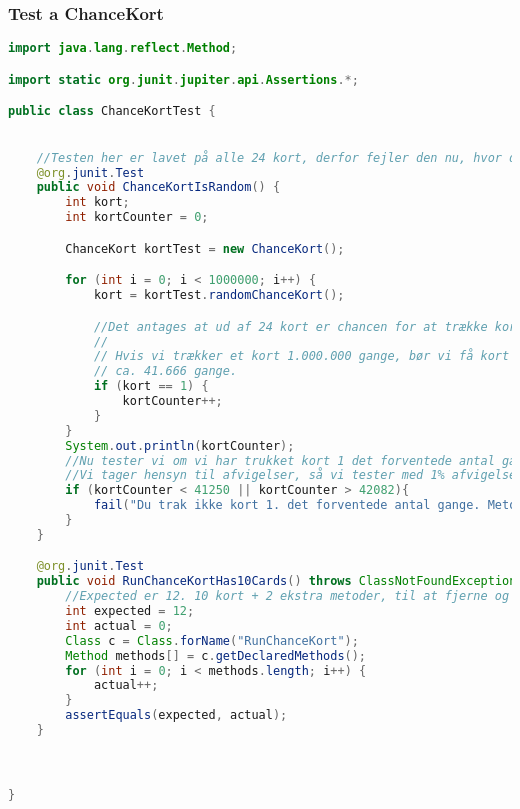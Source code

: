 \subsubsection{Test a ChanceKort}\label{ChanceKortTest}
\begin{lstlisting}[language=Java, caption=ChanceKort is random test]
import java.lang.reflect.Method;

import static org.junit.jupiter.api.Assertions.*;

public class ChanceKortTest {

    
    //Testen her er lavet på alle 24 kort, derfor fejler den nu, hvor der kun er 10 kort. Testen var en succes, da der var 24 kort. Dette ses også i rapporten.
    @org.junit.Test
    public void ChanceKortIsRandom() {
        int kort;
        int kortCounter = 0;

        ChanceKort kortTest = new ChanceKort();

        for (int i = 0; i < 1000000; i++) {
            kort = kortTest.randomChanceKort();

            //Det antages at ud af 24 kort er chancen for at trække kort 1. = 1/24
            //
            // Hvis vi trækker et kort 1.000.000 gange, bør vi få kort 1.
            // ca. 41.666 gange.
            if (kort == 1) {
                kortCounter++;
            }
        }
        System.out.println(kortCounter);
        //Nu tester vi om vi har trukket kort 1 det forventede antal gange
        //Vi tager hensyn til afvigelser, så vi tester med 1% afvigelse fra det forventede antal
        if (kortCounter < 41250 || kortCounter > 42082){
            fail("Du trak ikke kort 1. det forventede antal gange. Metoden er altså ikke tilfældig");
        }
    }

    @org.junit.Test
    public void RunChanceKortHas10Cards() throws ClassNotFoundException {
        //Expected er 12. 10 kort + 2 ekstra metoder, til at fjerne og tilføje biler.
        int expected = 12;
        int actual = 0;
        Class c = Class.forName("RunChanceKort");
        Method methods[] = c.getDeclaredMethods();
        for (int i = 0; i < methods.length; i++) {
            actual++;
        }
        assertEquals(expected, actual);
    }



}
\end{lstlisting}